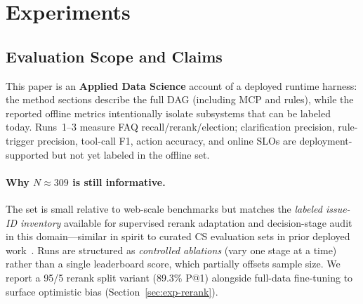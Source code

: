 \documentclass[sigconf,review]{acmart}
\begin{document}
\begin{table}[t]
  \caption{Post-launch deployment metrics. ``Baseline'' should be the pre-harness bot or the immediately preceding production configuration on the same traffic slice.}
  \label{tab:post-launch-placeholder}
  \centering
  \footnotesize
  \setlength{\tabcolsep}{3pt}
\end{table}

\FloatBarrier
\section{Experiments}
\label{sec:experiments}

\subsection{Evaluation Scope and Claims}
\label{sec:eval-scope}

This paper is an \textbf{Applied Data Science} account of a deployed runtime harness: the method sections describe the full DAG (including MCP and rules), while the reported offline metrics intentionally isolate subsystems that can be labeled today. Runs~1--3 measure FAQ recall/rerank/election; clarification precision, rule-trigger precision, tool-call F1, action accuracy, and online SLOs are deployment-supported but not yet labeled in the offline set.

\paragraph{Why $N{\approx}309$ is still informative.}
The set is small relative to web-scale benchmarks but matches the \emph{labeled issue-ID inventory} available for supervised rerank adaptation and decision-stage audit in this domain---similar in spirit to curated CS evaluation sets in prior deployed work~\cite{xu2024cskg}. Runs are structured as \emph{controlled ablations} (vary one stage at a time) rather than a single leaderboard score, which partially offsets sample size. We report a 95/5 rerank split variant (89.3\% P@1) alongside full-data fine-tuning to surface optimistic bias (Section~\ref{sec:exp-rerank}).
\end{document}
